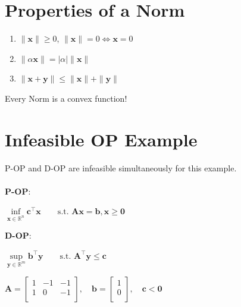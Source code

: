 \documentclass[english]{latex4ei/latex4ei_sheet}
\begin{document}
\section{Properties of a Norm}

\begin{sectionbox}
	\begin{enumerate}
		\item $\| \bm{x} \| \geq 0$, $\| \bm{x} \| = 0 \iff \bm{x} = 0$
		\item $\| \alpha \bm{x} \| = \mid \alpha \mid \| \bm{x} \|$
		\item $\| \bm{x} + \bm{y} \| \leq \| \bm{x} \| + \| \bm{y} \|$
	\end{enumerate}
	\vspace{0.5em}
	\begin{center}
		Every Norm is a convex function!
	\end{center}
\end{sectionbox}

\section{Infeasible OP Example}
\begin{sectionbox}
	P-OP and D-OP are infeasible simultaneously for this example. \\
	\\
	\textbf{P-OP}:
	\begin{center}
		$\inf\limits_{\bm{x} \in \mathbb{R}^n} \bm{c}^\intercal\bm{x} \qquad \text{s.t. } \bm{A}\bm{x} = \bm{b}, \bm{x} \geq \bm{0}$
	\end{center}
	\textbf{D-OP}:
	\begin{center}
		$\sup\limits_{\bm{y} \in \mathbb{R}^m} \bm{b}^\intercal\bm{y} \qquad \text{s.t. } \bm{A}^\intercal\bm{y} \leq \bm{c}$
	\end{center}
	\begin{center}
		$\bm{A} = \begin{bmatrix}
			1 & -1 & -1 \\
			1 & 0 & -1 \\
		\end{bmatrix}, \quad \bm{b} = \begin{bmatrix}
		1 \\
		0 \\
	\end{bmatrix}, \quad \bm{c} < \bm{0}$
	\end{center}

\end{sectionbox}
\end{document}
